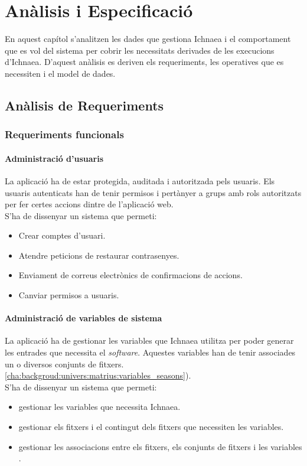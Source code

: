\chapter{An\`{a}lisis i Especificaci\'{o}}
\label{cha:specification}
En aquest cap\'{i}tol s'analitzen les dades que gestiona Ichnaea i el comportament que es vol del sistema per cobrir les necessitats derivades de les execucions d'Ichnaea. D'aquest anàlisis es deriven els requeriments, les operatives que es necessiten i el model de dades.

\section{An\`{a}lisis de Requeriments}

\subsection{Requeriments funcionals}
\subsubsection{Administraci\'{o} d'usuaris}
La aplicaci\'{o} ha de estar protegida, auditada i autoritzada pels usuaris. Els usuaris autenticats han de tenir permisos i  pertànyer a grups amb rols autoritzats per fer certes accions dintre de l'aplicació web.\\ 

S'ha de dissenyar un sistema que permeti:
\begin{itemize}
\item Crear comptes d'usuari.
\item Atendre peticions de restaurar contrasenyes.
\item Enviament de correus electrònics de confirmacions de accions.
\item Canviar permisos a usuaris.
\end{itemize}

\subsubsection{Administraci\'{o} de variables de sistema}
La aplicaci\'{o} ha de gestionar les variables que Ichnaea utilitza per poder generar les entrades que necessita el \textit{software}. Aquestes variables han de tenir associades un o diversos conjunts de fitxers.\ref{cha:backgroud:univers:matrius:variables_seasons}).\\

S'ha de dissenyar un sistema que permeti:
\begin{itemize}
\item gestionar les variables que necessita Ichnaea.
\item gestionar els fitxers i el contingut dels fitxers que necessiten les variables.
\item gestionar les associacions entre els fitxers, els conjunts de fitxers i les variables .
\end{itemize} 


